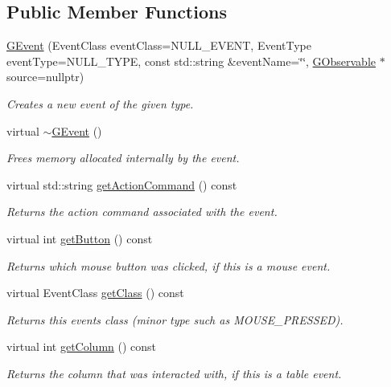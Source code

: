 \subsection*{Public Member Functions}
\begin{DoxyCompactItemize}
\item 
\mbox{\hyperlink{classGEvent_a310475311d619e2b4066a0ee34c1153e}{G\+Event}} (Event\+Class event\+Class=N\+U\+L\+L\+\_\+\+E\+V\+E\+NT, Event\+Type event\+Type=N\+U\+L\+L\+\_\+\+T\+Y\+PE, const std\+::string \&event\+Name=\char`\"{}\char`\"{}, \mbox{\hyperlink{classGObservable}{G\+Observable}} $\ast$source=nullptr)
\begin{DoxyCompactList}\small\item\em Creates a new event of the given type. \end{DoxyCompactList}\item 
virtual \mbox{\hyperlink{classGEvent_a294ad1d22669baa2bae04f3d75eb183c}{$\sim$\+G\+Event}} ()
\begin{DoxyCompactList}\small\item\em Frees memory allocated internally by the event. \end{DoxyCompactList}\item 
virtual std\+::string \mbox{\hyperlink{classGEvent_a94eb4276000c4fdfb508ce9e6317a82a}{get\+Action\+Command}} () const
\begin{DoxyCompactList}\small\item\em Returns the action command associated with the event. \end{DoxyCompactList}\item 
virtual int \mbox{\hyperlink{classGEvent_a206a3a5ac61ccb2de0208401739c5425}{get\+Button}} () const
\begin{DoxyCompactList}\small\item\em Returns which mouse button was clicked, if this is a mouse event. \end{DoxyCompactList}\item 
virtual Event\+Class \mbox{\hyperlink{classGEvent_a389eadf538a5311effff6a08d0426b34}{get\+Class}} () const
\begin{DoxyCompactList}\small\item\em Returns this event\textquotesingle{}s class (minor type such as M\+O\+U\+S\+E\+\_\+\+P\+R\+E\+S\+S\+ED). \end{DoxyCompactList}\item 
virtual int \mbox{\hyperlink{classGEvent_a36cb86612277798a9adb168403386280}{get\+Column}} () const
\begin{DoxyCompactList}\small\item\em Returns the column that was interacted with, if this is a table event. \end{DoxyCompactList}\item 

\end{DoxyCompactItemize}
